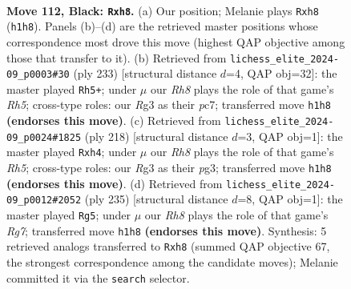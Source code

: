 \documentclass[11pt]{article}
\begin{document}
\clearpage

\begin{figure}[p]\centering
\begin{subfigure}{0.46\textwidth}\centering
\resizebox{\linewidth}{!}{%
\newchessgame
\chessboard[
  setfen={7R/8/8/5k2/8/6r1/4K3/7r b - - 35 112},
  showmover=false,
  pgfstyle=straightmove, color=movearrow, markmove={h1-h8}
]}
\caption{}
\end{subfigure}\hfill
\begin{subfigure}{0.46\textwidth}\centering
\resizebox{\linewidth}{!}{%
\newchessgame
\chessboard[
  setfen={k7/2P5/8/4K3/1R5r/8/8/8 b - - 44 117},
  showmover=false,
  pgfstyle=straightmove, color=movearrow, markmove={h4-h5}
]}
\caption{}
\end{subfigure}
\\[4pt]
\begin{subfigure}{0.46\textwidth}\centering
\resizebox{\linewidth}{!}{%
\newchessgame
\chessboard[
  setfen={8/8/5k2/7R/7r/K5p1/8/8 w - - 0 110},
  showmover=false,
  pgfstyle=straightmove, color=movearrow, markmove={h5-h4}
]}
\caption{}
\end{subfigure}\hfill
\begin{subfigure}{0.46\textwidth}\centering
\resizebox{\linewidth}{!}{%
\newchessgame
\chessboard[
  setfen={8/7R/8/8/8/1k3K2/6r1/8 b - - 13 118},
  showmover=false,
  pgfstyle=straightmove, color=movearrow, markmove={g2-g5}
]}
\caption{}
\end{subfigure}
\caption{\textbf{Move 112, Black: \texttt{Rxh8}.} (a) Our position; Melanie plays \texttt{Rxh8} (\texttt{h1h8}). Panels (b)--(d) are the retrieved master positions whose correspondence most drove this move (highest QAP objective among those that transfer to it). (b) Retrieved from \texttt{lichess\_elite\_2024-09\_p0003\#30} (ply 233) [structural distance $d$=4, QAP obj=32]: the master played \texttt{Rh5+}; under $\mu$ our \emph{Rh8} plays the role of that game's \emph{Rh5}; cross-type roles: our \emph{R}g3 as their \emph{p}c7; transferred move \texttt{h1h8} \textbf{(endorses this move)}. (c) Retrieved from \texttt{lichess\_elite\_2024-09\_p0024\#1825} (ply 218) [structural distance $d$=3, QAP obj=1]: the master played \texttt{Rxh4}; under $\mu$ our \emph{Rh8} plays the role of that game's \emph{Rh5}; cross-type roles: our \emph{R}g3 as their \emph{p}g3; transferred move \texttt{h1h8} \textbf{(endorses this move)}. (d) Retrieved from \texttt{lichess\_elite\_2024-09\_p0012\#2052} (ply 235) [structural distance $d$=8, QAP obj=1]: the master played \texttt{Rg5}; under $\mu$ our \emph{Rh8} plays the role of that game's \emph{Rg7}; transferred move \texttt{h1h8} \textbf{(endorses this move)}. Synthesis: 5 retrieved analogs transferred to \texttt{Rxh8} (summed QAP objective 67, the strongest correspondence among the candidate moves); Melanie committed it via the \texttt{search} selector.}
\label{fig:thought-m223}
\end{figure}
\end{document}
